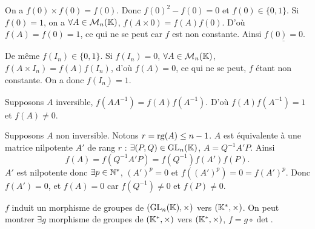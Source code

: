 \begin{solution}
On a $f(0)\times f(0)=f(0)$. Donc $f(0)^2-f(0)=0$ et $f(0)\in\{0,1\}$.
Si $f(0)=1$, on a $\forall A\in\mathcal M_n(\mathbb K)$, $f(A\times0)=f(A)f(0)$. D'où
$f(A)=f(0)=1$, ce qui ne se peut car $f$ est non constante. Ainsi
$\underline{f(0)=0}$.

De même $f(I_n)\in\{0,1\}$. Si $f(I_n)=0$, $\forall A\in\mathcal M_n(\mathbb K)$,
$f(A\times I_n)=f(A)f(I_n)$, d'où $f(A)=0$, ce qui ne se peut, $f$ étant non constante.
On a donc $\underline{f(I_n)=1}$.

Supposons $A$ inversible, $f(AA^{-1})=f(A)f(A^{-1})$. D'où
$f(A)f(A^{-1})=1$ et $f(A)\neq0$.

Supposons $A$ non inversible. Notons $r=\operatorname{rg}(A)\leq n-1$. $A$ est équivalente à une
matrice nilpotente $A'$ de rang $r$ : $\exists(P,Q)\in\operatorname{GL}_n(\mathbb K)$,
$A=Q^{-1}A'P$. Ainsi
\[
f(A)=f(Q^{-1}A'P)=f(Q^{-1})f(A')f(P).
\]
$A'$ est nilpotente donc $\exists p\in\mathbb N^*$, $(A')^p=0$ et
$f((A')^p)=0=f(A')^p$. Donc $f(A')=0$, et $f(A)=0$ car
$f(Q^{-1})\neq0$ et $f(P)\neq0$.

\begin{remarkbox}
$f$ induit un morphisme de groupes de $(\operatorname{GL}_n(\mathbb K),\times)$ vers $(\mathbb K^*,\times)$.
On peut montrer $\exists g$ morphisme de groupes de $(\mathbb K^*,\times)$ vers
$(\mathbb K^*,\times)$, $f=g\circ\det$.
\end{remarkbox}
\end{solution}
